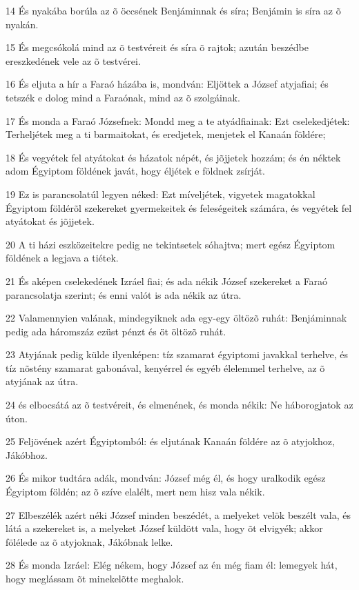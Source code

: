 \par 14 És nyakába borúla az õ öccsének Benjáminnak és síra; Benjámin is síra az õ nyakán.
\par 15 És megcsókolá mind az õ testvéreit és síra õ rajtok; azután beszédbe ereszkedének vele az õ testvérei.
\par 16 És eljuta a hír a Faraó házába is, mondván: Eljöttek a József atyjafiai; és tetszék e dolog mind a Faraónak, mind az õ szolgáinak.
\par 17 És monda a Faraó Józsefnek: Mondd meg a te atyádfiainak: Ezt cselekedjétek: Terheljétek meg a ti barmaitokat, és eredjetek, menjetek el Kanaán földére;
\par 18 És vegyétek fel atyátokat és házatok népét, és jõjjetek hozzám; és én néktek adom Égyiptom földének javát, hogy éljétek e földnek zsírját.
\par 19 Ez is parancsolatúl legyen néked: Ezt míveljétek, vigyetek magatokkal Égyiptom földérõl szekereket gyermekeitek és feleségeitek számára, és vegyétek fel atyátokat és jõjjetek.
\par 20 A ti házi eszközeitekre pedig ne tekintsetek sóhajtva; mert egész Égyiptom földének a legjava a tiétek.
\par 21 És aképen cselekedének Izráel fiai; és ada nékik József szekereket a Faraó parancsolatja szerint; és enni valót is ada nékik az útra.
\par 22 Valamennyien valának, mindegyiknek ada egy-egy öltözõ ruhát: Benjáminnak pedig ada háromszáz ezüst pénzt és öt öltözõ ruhát.
\par 23 Atyjának pedig külde ilyenképen: tíz szamarat égyiptomi javakkal terhelve, és tíz nõstény szamarat gabonával, kenyérrel és egyéb élelemmel terhelve, az õ atyjának az útra.
\par 24 és elbocsátá az õ testvéreit, és elmenének, és monda nékik: Ne háborogjatok az úton.
\par 25 Feljövének azért Égyiptomból: és eljutának Kanaán földére az õ atyjokhoz, Jákóbhoz.
\par 26 És mikor tudtára adák, mondván: József még él, és hogy uralkodik egész Égyiptom földén; az õ szíve elalélt, mert nem hisz vala nékik.
\par 27 Elbeszélék azért néki József minden beszédét, a melyeket velök beszélt vala, és látá a szekereket is, a melyeket József küldött vala, hogy õt elvigyék; akkor fölélede az õ atyjoknak, Jákóbnak lelke.
\par 28 És monda Izráel: Elég nékem, hogy József az én még fiam él: lemegyek hát, hogy meglássam õt minekelõtte meghalok.

